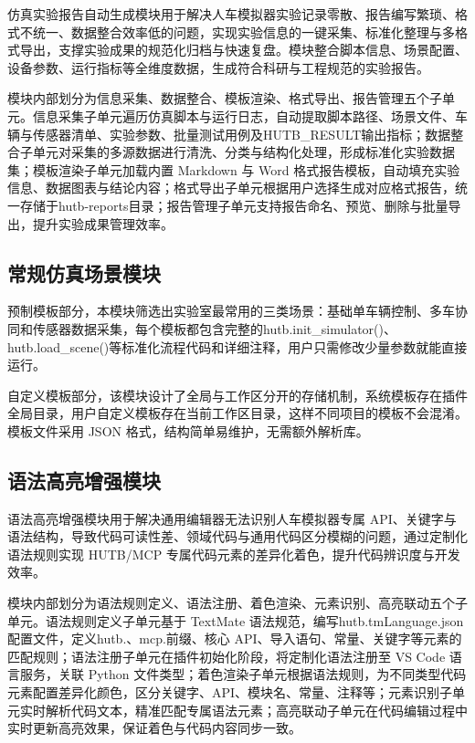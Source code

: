 仿真实验报告自动生成模块用于解决人车模拟器实验记录零散、报告编写繁琐、格式不统一、数据整合效率低的问题，实现实验信息的一键采集、标准化整理与多格式导出，支撑实验成果的规范化归档与快速复盘。模块整合脚本信息、场景配置、设备参数、运行指标等全维度数据，生成符合科研与工程规范的实验报告。

模块内部划分为信息采集、数据整合、模板渲染、格式导出、报告管理五个子单元。信息采集子单元遍历仿真脚本与运行日志，自动提取脚本路径、场景文件、车辆与传感器清单、实验参数、批量测试用例及HUTB\_RESULT输出指标；数据整合子单元对采集的多源数据进行清洗、分类与结构化处理，形成标准化实验数据集；模板渲染子单元加载内置
Markdown 与 Word
格式报告模板，自动填充实验信息、数据图表与结论内容；格式导出子单元根据用户选择生成对应格式报告，统一存储于hutb-reports目录；报告管理子单元支持报告命名、预览、删除与批量导出，提升实验成果管理效率。

\subsection{常规仿真场景模块}

预制模板部分，本模块筛选出实验室最常用的三类场景：基础单车辆控制、多车协同和传感器数据采集，每个模板都包含完整的hutb.init\_simulator()、hutb.load\_scene()等标准化流程代码和详细注释，用户只需修改少量参数就能直接运行。

自定义模板部分，该模块设计了全局与工作区分开的存储机制，系统模板存在插件全局目录，用户自定义模板存在当前工作区目录，这样不同项目的模板不会混淆。模板文件采用
JSON 格式，结构简单易维护，无需额外解析库。

\subsection{语法高亮增强模块}

语法高亮增强模块用于解决通用编辑器无法识别人车模拟器专属
API、关键字与语法结构，导致代码可读性差、领域代码与通用代码区分模糊的问题，通过定制化语法规则实现
HUTB/MCP 专属代码元素的差异化着色，提升代码辨识度与开发效率。

模块内部划分为语法规则定义、语法注册、着色渲染、元素识别、高亮联动五个子单元。语法规则定义子单元基于
TextMate
语法规范，编写hutb.tmLanguage.json配置文件，定义hutb.、mcp.前缀、核心
API、导入语句、常量、关键字等元素的匹配规则；语法注册子单元在插件初始化阶段，将定制化语法注册至
VS Code 语言服务，关联 Python
文件类型；着色渲染子单元根据语法规则，为不同类型代码元素配置差异化颜色，区分关键字、API、模块名、常量、注释等；元素识别子单元实时解析代码文本，精准匹配专属语法元素；高亮联动子单元在代码编辑过程中实时更新高亮效果，保证着色与代码内容同步一致。

